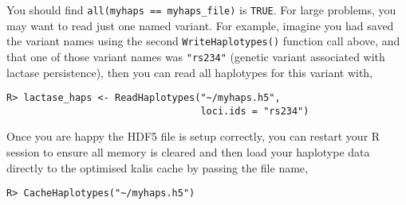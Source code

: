 \documentclass[a4paper]{article}
\let\proglang=\textsf
\newcommand{\pkg}[1]{{\fontseries{m}\fontseries{b}\selectfont #1}}
\begin{document}
You should find \texttt{all(myhaps\ ==\ myhaps\_file)} is \texttt{TRUE}.
For large problems, you may want to read just one named variant.
For example, imagine you had saved the variant names using the second \texttt{WriteHaplotypes()} function call above, and that one of those variant names was \texttt{"rs234"} (genetic variant associated with lactase persistence), then you can read all haplotypes for this variant with,

\begin{verbatim}
R> lactase_haps <- ReadHaplotypes("~/myhaps.h5",
                                  loci.ids = "rs234")
\end{verbatim}

Once you are happy the HDF5 file is setup correctly, you can restart your \proglang{R} session to ensure all memory is cleared and then load your haplotype data directly to the optimised \pkg{kalis} cache by passing the file name,

\begin{verbatim}
R> CacheHaplotypes("~/myhaps.h5")
\end{verbatim}



\end{document}
